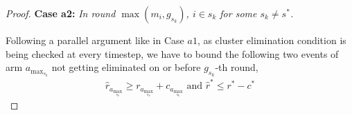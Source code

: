 \begin{proof}
\textbf{Case a2:} \textit{In round $\max(m_{i},g_{s_{k}})$, ${i} \in s_k$ for some $s_k \ne s^{*}$.}

%
%
%
%  
%   
% 
% 
%

Following a parallel argument like in Case $a1$, as cluster elimination condition is being checked at  every timestep, we have to bound the following two events of arm $a_{\max_{s_{k}}}$ not getting eliminated on or before $g_{s_{k}}$-th round,
\begin{align*}
  \hat{r}_{a_{\max_{s_{k}}}} \geq r_{a_{\max_{s_{k}}}} +c_{a_{\max_{s_{k}}}} \text{ and } \hat{r}^{*} \leq r^{*} -c^{*}  
\end{align*} 


\end{proof}
